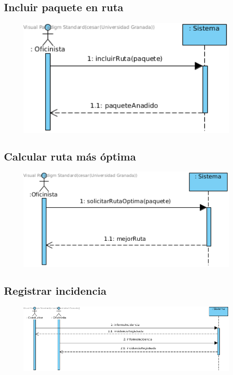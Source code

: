 \subsection{Incluir paquete en ruta}
\begin{figure}[H]
	\centering
	\includegraphics[width=16cm]{33}
\end{figure}
\subsection{Calcular ruta más óptima}
\begin{figure}[H]
	\centering
	\includegraphics[width=16cm]{34}
\end{figure}
\subsection{Registrar incidencia}
\begin{figure}[H]
	\centering
	\includegraphics[width=16cm]{35}
\end{figure}
